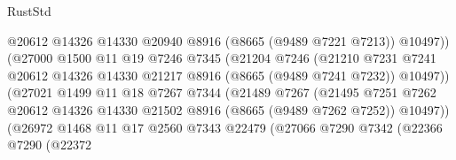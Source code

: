 \begin{lexlean}{RustStd}
\begin{coremodule}
                                      @20612
                                      @14326
                                      @14330
                                      @20940
                                      @8916
                                      (@8665 (@9489 @7221 @7213))
                                      @10497))
                                  (@27000
                                    @1500
                                    @11
                                    @19
                                    @7246
                                    @7345
                                    (@21204
                                      @7246
                                      (@21210
                                        @7231
                                        @7241
                                        @20612
                                        @14326
                                        @14330
                                        @21217
                                        @8916
                                        (@8665 (@9489 @7241 @7232))
                                        @10497))
                                    (@27021
                                      @1499
                                      @11
                                      @18
                                      @7267
                                      @7344
                                      (@21489
                                        @7267
                                        (@21495
                                          @7251
                                          @7262
                                          @20612
                                          @14326
                                          @14330
                                          @21502
                                          @8916
                                          (@8665 (@9489 @7262 @7252))
                                          @10497))
                                      (@26972
                                        @1468
                                        @11
                                        @17
                                        @2560
                                        @7343
                                        @22479
                                        (@27066
                                          @7290
                                          @7342
                                          (@22366
                                            @7290
                                            (@22372

\end{coremodule}
\end{lexlean}
